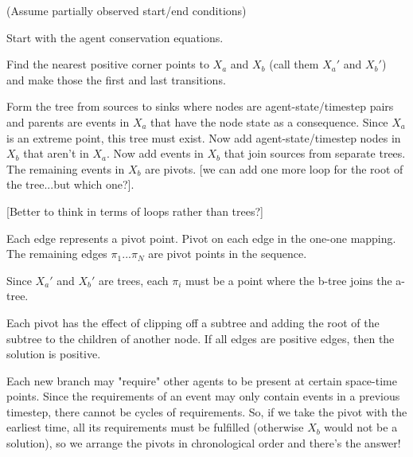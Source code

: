 \documentclass{article}
\begin{document}
(Assume partially observed start/end conditions)

Start with the agent conservation equations.

Find the nearest positive corner points to $X_a$ and $X_b$ (call them $X_a'$ and $X_b'$) and make those the first and last transitions.

Form the tree from sources to sinks where nodes are agent-state/timestep pairs and parents are events in $X_a$ that have the node state as a consequence. Since $X_a$ is an extreme point, this tree must exist. Now add agent-state/timestep nodes in $X_b$ that aren't in $X_a$. Now add events in $X_b$ that join sources from separate trees. The remaining events in $X_b$ are pivots. [we can add one more loop for the root of the tree...but which one?]. 

[Better to think in terms of loops rather than trees?]


Each edge represents a pivot point. Pivot on each edge in the one-one mapping. The remaining edges $\pi_1...\pi_N$ are pivot points in the sequence.

Since $X_a'$ and $X_b'$ are trees, each $\pi_i$ must be a point where the b-tree joins the a-tree.

Each pivot has the effect of clipping off a subtree and adding the root of the subtree to the children of another node. If all edges are positive edges, then the solution is positive.

Each new branch may "require" other agents to be present at certain space-time points. Since the requirements of an event may only contain events in a previous timestep, there cannot be cycles of requirements. So, if we take the pivot with the earliest time, all its requirements must be fulfilled (otherwise $X_b$ would not be a solution), so we arrange the pivots in chronological order and there's the answer!


%
% 


\end{document}
